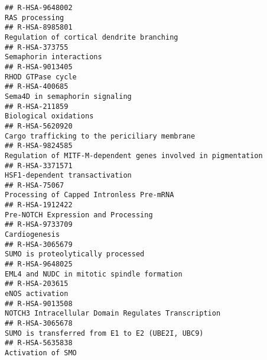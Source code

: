 \documentclass[
]{article}
\begin{document}
\begin{verbatim}
## R-HSA-9648002                                                                                                                       RAS processing
## R-HSA-8985801                                                                                            Regulation of cortical dendrite branching
## R-HSA-373755                                                                                                               Semaphorin interactions
## R-HSA-9013405                                                                                                                    RHOD GTPase cycle
## R-HSA-400685                                                                                                        Sema4D in semaphorin signaling
## R-HSA-211859                                                                                                                 Biological oxidations
## R-HSA-5620920                                                                                        Cargo trafficking to the periciliary membrane
## R-HSA-9824585                                                                        Regulation of MITF-M-dependent genes involved in pigmentation
## R-HSA-3371571                                                                                                       HSF1-dependent transactivation
## R-HSA-75067                                                                                               Processing of Capped Intronless Pre-mRNA
## R-HSA-1912422                                                                                                  Pre-NOTCH Expression and Processing
## R-HSA-9733709                                                                                                                        Cardiogenesis
## R-HSA-3065679                                                                                                    SUMO is proteolytically processed
## R-HSA-9648025                                                                                           EML4 and NUDC in mitotic spindle formation
## R-HSA-203615                                                                                                                       eNOS activation
## R-HSA-9013508                                                                                  NOTCH3 Intracellular Domain Regulates Transcription
## R-HSA-3065678                                                                                      SUMO is transferred from E1 to E2 (UBE2I, UBC9)
## R-HSA-5635838                                                                                                                    Activation of SMO

\end{verbatim}
\end{document}
